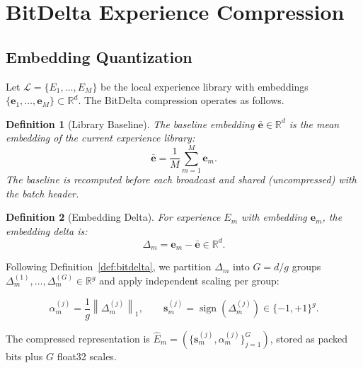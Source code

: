 \documentclass[11pt]{article}
\newtheorem{definition}{Definition}
\DeclareMathOperator{\sign}{sign}
\begin{document}
\section{BitDelta Experience Compression}
\label{sec:bitdelta}

\subsection{Embedding Quantization}

Let $\mathcal{L} = \{E_1, \ldots, E_M\}$ be the local experience library with
embeddings $\{\bm{e}_1, \ldots, \bm{e}_M\} \subset \mathbb{R}^d$. The BitDelta
compression operates as follows.

\begin{definition}[Library Baseline]
The baseline embedding $\bar{\bm{e}} \in \mathbb{R}^d$ is the mean embedding
of the current experience library:
\begin{equation}
    \bar{\bm{e}} = \frac{1}{M} \sum_{m=1}^{M} \bm{e}_m.
    \label{eq:baseline}
\end{equation}
The baseline is recomputed before each broadcast and shared (uncompressed)
with the batch header.
\end{definition}

\begin{definition}[Embedding Delta]
For experience $E_m$ with embedding $\bm{e}_m$, the embedding delta is:
\begin{equation}
    \Delta_m = \bm{e}_m - \bar{\bm{e}} \in \mathbb{R}^d.
    \label{eq:delta}
\end{equation}
\end{definition}

Following Definition~\ref{def:bitdelta}, we partition $\Delta_m$ into
$G = d / g$ groups $\Delta_m^{(1)}, \ldots, \Delta_m^{(G)} \in \mathbb{R}^g$
and apply independent scaling per group:

\begin{equation}
    \alpha_m^{(j)} = \frac{1}{g} \left\|\Delta_m^{(j)}\right\|_1,
    \qquad
    \bm{s}_m^{(j)} = \sign\!\left(\Delta_m^{(j)}\right) \in \{-1,+1\}^g.
    \label{eq:group-quantize}
\end{equation}

The compressed representation is $\widehat{E}_m = \left(\{\bm{s}_m^{(j)}, \alpha_m^{(j)}\}_{j=1}^G\right)$,
stored as packed bits plus $G$ float32 scales.
\end{document}
